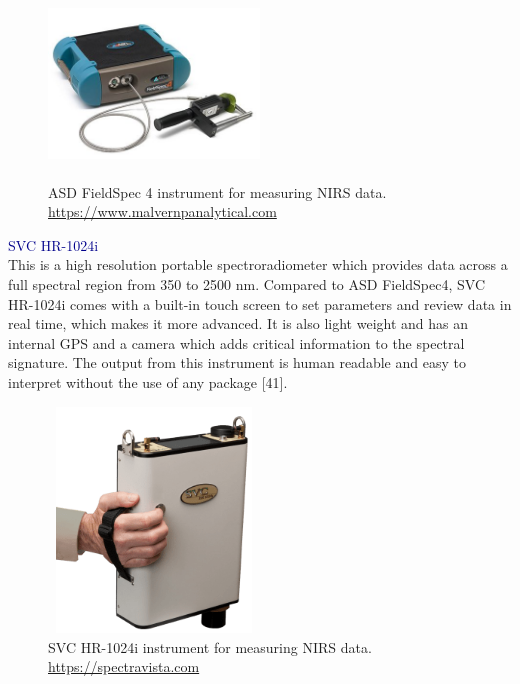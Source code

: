 \documentclass[12pt,a4paper]{report}
\begin{document}
\begin{figure}[h]
    \centering
    \includegraphics[width=0.5\textwidth, height=5cm]{Figures/asd.jpg} 
    \caption{ASD FieldSpec 4 instrument for measuring NIRS data.\\ \url{https://www.malvernpanalytical.com}}
    \label{fig:fieldspec4}
\end{figure}

\textcolor{darkblue}{SVC HR-1024i}\\
This is a high resolution portable spectroradiometer which provides data across a full spectral region from 350 to 2500 nm. Compared to ASD FieldSpec4, SVC HR-1024i comes with a built-in touch screen to set parameters and review data in real time, which makes it more advanced. It is also light weight and has an internal GPS and a camera which adds critical information to the spectral signature. The output from this instrument is human readable and easy to interpret without the use of any package [41].

\begin{figure}[h]
    \centering
    \includegraphics[width=0.5\textwidth, height=6cm]{Figures/svc.png} 
    \caption{SVC HR-1024i instrument for measuring NIRS data.\\
    \url{https://spectravista.com}}
    \label{fig:svc}
\end{figure}
\end{document}
